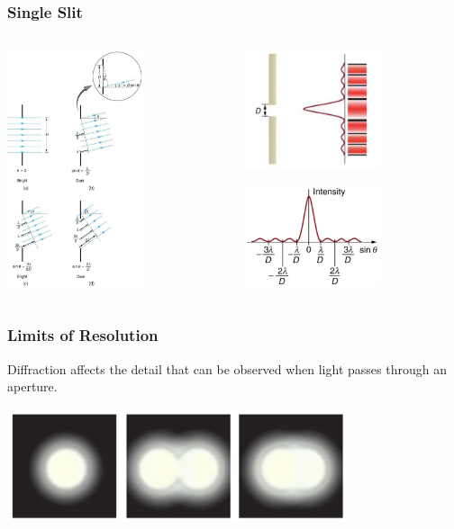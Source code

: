 \documentclass{beamer}
\begin{document}
\begin{frame}\frametitle{Single Slit}
\begin{columns}
\begin{column}{5cm}
\begin{center}
\includegraphics[height=7cm]{fig/sl2.jpg}
\end{center}


\end{column}
\begin{column}{6cm}
\begin{center}
\includegraphics[width=4cm]{fig/sl1.jpg}

\includegraphics[width=4cm]{fig/sl3.jpg}
\end{center}
\end{column}
\end{columns}
\end{frame}


\begin{frame}\frametitle{Limits of Resolution}

Diffraction affects the detail that can be observed when light passes through an aperture.

\vspace{0.5cm}

\begin{center}
\includegraphics[width=10cm]{fig/rayleigh1.jpg}
\end{center}

\end{frame}
\end{document}
